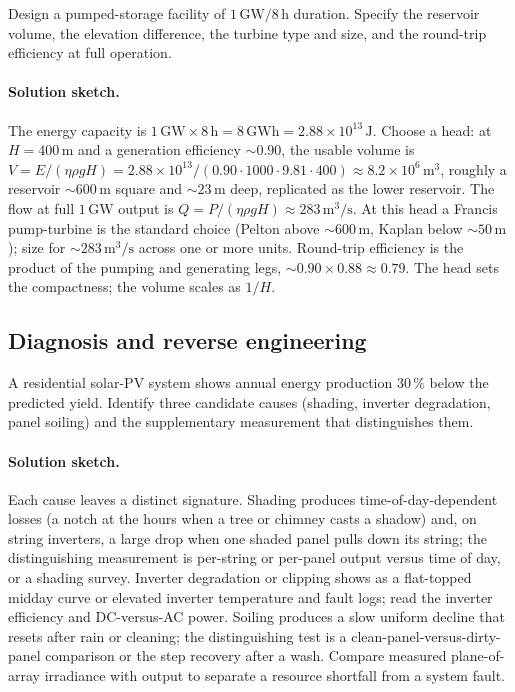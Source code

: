 \begin{exercise}
Design a pumped-storage facility of $1\,\si{\giga\watt}/8\,\si{\hour}$
duration. Specify the reservoir volume, the elevation difference, the
turbine type and size, and the round-trip efficiency at full
operation.
\paragraph{Solution sketch.}
The energy capacity is $1\,\si{\giga\watt}\times8\,\si{\hour} = 8\,\si{
\giga\watt\hour} = 2.88\times10^{13}\,\si{\joule}$. Choose a head: at
$H = 400\,\si{\meter}$ and a generation efficiency $\sim 0.90$, the
usable volume is $V = E/(\eta\rho g H) = 2.88\times10^{13}/(0.90\cdot
1000\cdot9.81\cdot400) \approx 8.2\times10^{6}\,\si{\meter\cubed}$,
roughly a reservoir $\sim 600\,\si{\meter}$ square and $\sim 23\,\si{
\meter}$ deep, replicated as the lower reservoir. The flow at full
$1\,\si{\giga\watt}$ output is $Q = P/(\eta\rho g H) \approx 283\,\si{
\meter\cubed\per\second}$. At this head a Francis pump-turbine is the
standard choice (Pelton above $\sim 600\,\si{\meter}$, Kaplan below
$\sim 50\,\si{\meter}$); size for $\sim 283\,\si{\meter\cubed\per\second}$
across one or more units. Round-trip efficiency is the product of the
pumping and generating legs, $\sim 0.90\times0.88 \approx 0.79$. The
head sets the compactness; the volume scales as $1/H$.
\end{exercise}

\subsection*{Diagnosis and reverse engineering}

\begin{exercise}
A residential solar-PV system shows annual energy production $30\,\%$
below the predicted yield. Identify three candidate causes (shading,
inverter degradation, panel soiling) and the supplementary
measurement that distinguishes them.
\paragraph{Solution sketch.}
Each cause leaves a distinct signature. Shading produces
time-of-day-dependent losses (a notch at the hours when a tree or
chimney casts a shadow) and, on string inverters, a large drop when one
shaded panel pulls down its string; the distinguishing measurement is
per-string or per-panel output versus time of day, or a shading survey.
Inverter degradation or clipping shows as a flat-topped midday curve or
elevated inverter temperature and fault logs; read the inverter
efficiency and DC-versus-AC power. Soiling produces a slow uniform
decline that resets after rain or cleaning; the distinguishing test is a
clean-panel-versus-dirty-panel comparison or the step recovery after a
wash. Compare measured plane-of-array irradiance with output to
separate a resource shortfall from a system fault.
\end{exercise}

